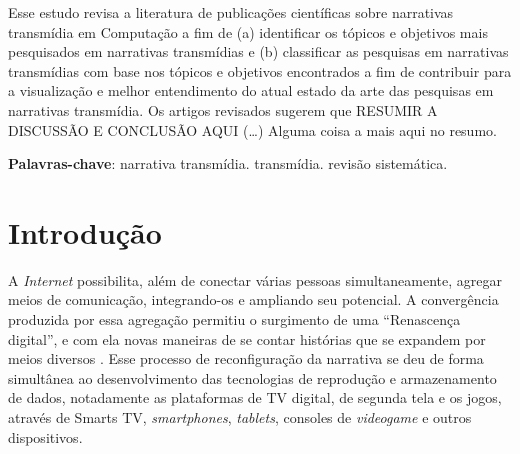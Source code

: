 \documentclass[
article,			%
11pt,				%
oneside,			%
a4paper,			%
english,			%
brazil,				%
sumario=tradicional
]{abntex2}
\begin{document}

  \frenchspacing


  \maketitle

  \begin{resumoumacoluna}
    Esse estudo revisa a literatura de publicações científicas sobre narrativas transmídia em Computação a fim de (a) identificar os tópicos e objetivos mais pesquisados em narrativas transmídias e (b) classificar as pesquisas em narrativas transmídias com base nos tópicos e objetivos encontrados a fim de contribuir para a visualização e melhor entendimento do atual estado da arte das pesquisas em narrativas transmídia. Os artigos revisados sugerem que \textsf{RESUMIR A DISCUSSÃO E CONCLUSÃO AQUI} (\ldots) Alguma coisa a mais aqui no resumo.

    \vspace{\onelineskip}

    \noindent
    \textbf{Palavras-chave}: narrativa transmídia. transmídia. revisão sistemática.
  \end{resumoumacoluna}

  \textual

  \section{Introdução}

  A \textit{Internet} possibilita, além de conectar várias pessoas simultaneamente, agregar meios de comunicação, integrando-os e ampliando seu potencial. A convergência produzida por essa agregação permitiu o surgimento de uma ``Renascença digital'', e com ela novas maneiras de se contar histórias que se expandem por meios diversos \cite{jenkins_2001}. Esse processo de reconfiguração da narrativa se deu de forma simultânea ao desenvolvimento das tecnologias de reprodução e armazenamento de dados, notadamente as plataformas de TV digital, de segunda tela e os jogos, através de Smarts TV, \textit{smartphones}, \textit{tablets}, consoles de \textit{videogame} e outros dispositivos.
\end{document}

